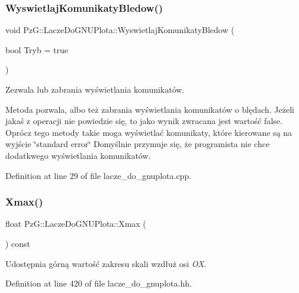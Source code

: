 \subsubsection{\texorpdfstring{Wyswietlaj\+Komunikaty\+Bledow()}{WyswietlajKomunikatyBledow()}}
{\footnotesize\ttfamily void Pz\+G\+::\+Lacze\+Do\+G\+N\+U\+Plota\+::\+Wyswietlaj\+Komunikaty\+Bledow (\begin{DoxyParamCaption}\item[{bool}]{Tryb = {\ttfamily true} }\end{DoxyParamCaption})}



Zezwala lub zabrania wyświetlania komunikatów. 

Metoda pozwala, albo też zabrania wyświetlania komunikatów o blędach. Jeżeli jakaś z operacji nie powiedzie się, to jako wynik zwracana jest wartość {\ttfamily false}. Oprócz tego metody takie moga wyświetlać komunikaty, które kierowane są na wyjście \char`\"{}standard error\char`\"{} Domyślnie przymuje się, że programista nie chce dodatkwego wyświetlania komunikatów. 

Definition at line 29 of file lacze\+\_\+do\+\_\+gnuplota.\+cpp.

\mbox{\label{class_pz_g_1_1_lacze_do_g_n_u_plota_a8e23479629af3df3d352b7839ae396b8}} 
\subsubsection{\texorpdfstring{Xmax()}{Xmax()}}
{\footnotesize\ttfamily float Pz\+G\+::\+Lacze\+Do\+G\+N\+U\+Plota\+::\+Xmax (\begin{DoxyParamCaption}{ }\end{DoxyParamCaption}) const\hspace{0.3cm}{\ttfamily [inline]}}

Udostępnia górną wartość zakresu skali wzdłuż osi {\itshape OX}. 

Definition at line 420 of file lacze\+\_\+do\+\_\+gnuplota.\+hh.

\mbox{\label{class_pz_g_1_1_lacze_do_g_n_u_plota_a66836c9749bf179420e4ca3e9447efd7}} 
